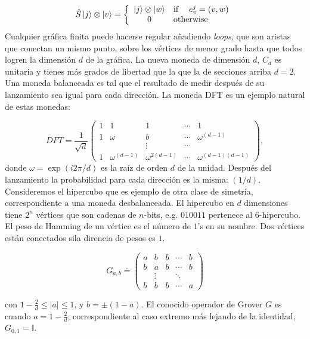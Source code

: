 \begin{equation*}{}
\hat{S}\ket{j}\otimes\ket{v}=
    \left\{
    \begin{array}{cl}
    \ket{j}\otimes\ket{w}    & \text{if}\,\;\;\;\;e^j_v=(v,w) \\
    0  & \text{otherwise}
    \end{array}{}
    \right.
\end{equation*}{}
Cualquier gráfica finita puede hacerse regular añadiendo \textit{loops}, que son aristas que conectan un mismo punto, sobre los vértices de menor grado hasta que todos logren la dimensión $d$ de la gráfica.
La nueva moneda de dimensión $d$, $C_d$ es unitaria y tienes más grados de libertad que la que la de secciones arriba $d=2$. Una moneda balanceada es tal que el resultado de medir después de su lanzamiento sea igual para cada dirección. La moneda DFT es un ejemplo natural de estas monedas:

\begin{equation*}
DFT=\frac{1}{\sqrt{d}}
\begin{pmatrix}
1 & 1 & 1 & \cdots & 1\\
1 & \omega & b & \cdots & \omega^{(d-1)}\\
 &  &\vdots & \cdots & \\
1 & \omega^{(d-1)}  & \omega^{2(d-1)} & \cdots & \omega^{(d-1)(d-1)}
\end{pmatrix},
\end{equation*}{}
donde $\omega=\exp{(i2\pi/d)}$ es la raíz de orden $d$ de la unidad. Después del lanzamiento la probabilidad para cada dirección es la misma: $(1/d)$.\\
Consideremos el hipercubo que es ejemplo de otra clase de simetría, correspondiente a una moneda desbalanceada. El hipercubo en $d$ dimensiones tiene $2^n$ vértices que son cadenas de $n$-bits, e.g. $010011$ pertenece al $6$-hipercubo. El peso de Hamming de un vértice es el número de $1$'s en su nombre. Dos vértices están conectados sila direncia de pesos es $1$.

\begin{equation*}
G_{a,b}\doteq
\begin{pmatrix}
a & b & b & \cdots & b\\
b & a & b & \cdots & b\\
 & \vdots & & \ddots & \\
b & b  & b & \cdots & a
\end{pmatrix}
\end{equation*}{}

con $1-\frac{2}{d}\leq|a|\leq 1$, y $b=\pm(1-a)$. El conocido operador de Grover $G$ es cuando $a=1-\frac{2}{d}$, correspondiente al caso extremo más lejando de la identidad, $G_{0,1}=\mathbb{I}$.

